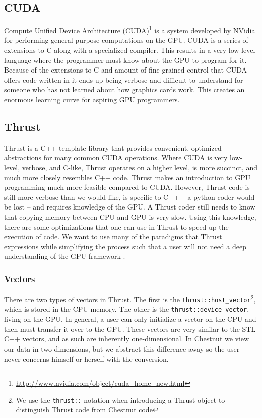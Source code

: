 \documentclass[twocolumn]{article}
\renewcommand{\|}{\origbar} %
\newcommand{\code}[1]{\texttt{#1}}
\begin{document}
\subsection{CUDA}

Compute Unified Device Architecture (CUDA)\footnote{\url{http://www.nvidia.com/object/cuda_home_new.html}} is a system developed by NVidia for performing general purpose computations on the GPU. CUDA is a series of extensions to C along with a specialized compiler. This results in a very low level language where the programmer must know about the GPU to program for it. Because of the extensions to C and amount of fine-grained control that CUDA offers code written in it ends up being verbose and difficult to understand for someone who has not learned about how graphics cards work. This creates an enormous learning curve for aspiring GPU programmers.

\subsection{Thrust}


Thrust is a C++ template library that provides convenient, optimized abstractions for many common CUDA operations. Where CUDA is very low-level, verbose, and C-like, Thrust operates on a higher level, is more succinct, and much more closely resembles C++ code. Thrust makes an introduction to GPU programming much more feasible compared to CUDA. However, Thrust code is still more verbose than we would like, is specific to C++ -- a python coder would be lost -- and requires knowledge of the GPU. A Thrust coder still needs to know that copying memory between CPU and GPU is very slow. Using this knowledge, there are some optimizations that one can use in Thrust to speed up the execution of code. We want to use many of the paradigms that Thrust expressions while simplifying the process such that a user will not need a deep understanding of the GPU framework \cite{hoberock}.

\subsubsection{Vectors}

There are two types of vectors in Thrust. The first is the \code{thrust::host\_vector}\footnote{We use the \code{thrust::} notation when introducing a Thrust object to distinguish Thrust code from Chestnut code}, which is stored in the CPU memory. The other is the \code{thrust::device\_vector}, living on the GPU. In general, a user can only initialize a vector on the CPU and then must transfer it over to the GPU. These vectors are very similar to the STL C++ vectors, and as such are inherently one-dimensional. In Chestnut we view our data in two-dimensions, but we abstract this difference away so the user never concerns himself or herself with the conversion. 
\end{document}
